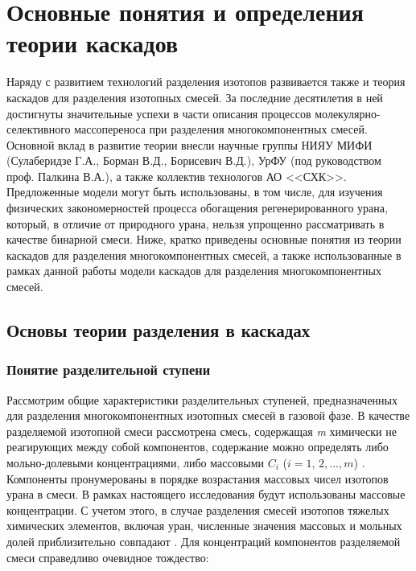 \chapter{Основные понятия и определения теории каскадов}

Наряду с развитием технологий разделения изотопов развивается также и теория каскадов для разделения изотопных смесей. За последние десятилетия в ней достигнуты значительные успехи в части описания процессов молекулярно-селективного массопереноса при разделения многокомпонентных смесей. Основной вклад в развитие теории внесли научные группы НИЯУ МИФИ (Сулаберидзе Г.А., Борман В.Д., Борисевич В.Д.), УрФУ (под руководством проф. Палкина В.А.), а также коллектив технологов АО <<СХК>>. Предложенные модели могут быть использованы, в том числе, для изучения физических закономерностей процесса обогащения регенерированного урана, который, в отличие от природного урана, нельзя упрощенно рассматривать в качестве бинарной смеси.
Ниже, кратко приведены основные понятия из теории каскадов для разделения многокомпонентных смесей, а также использованные в рамках данной работы модели каскадов для разделения многокомпонентных смесей.

\section{Основы теории разделения в каскадах}


\subsection{Понятие разделительной ступени}

Рассмотрим общие характеристики разделительных ступеней, предназначенных для разделения многокомпонентных изотопных смесей в газовой фазе. В качестве разделяемой изотопной смеси рассмотрена смесь, содержащая \textit{m} химически не реагирующих между собой компонентов, содержание можно определять либо мольно-долевыми концентрациями, либо массовыми $C_{i}$ ($i=1,\, 2,...,m$) \cite{sulaberidzeTeoriyaKaskadovDlya2011}. Компоненты пронумерованы в порядке возрастания массовых чисел изотопов урана в смеси. В рамках настоящего исследования будут использованы массовые концентрации. С учетом этого, в случае разделения смесей изотопов тяжелых химических элементов, включая уран, численные значения массовых и мольных долей приблизительно совпадают \cite{sulaberidzeTeoriyaKaskadovDlya2011}.  Для концентраций компонентов разделяемой смеси справедливо очевидное тождество:

